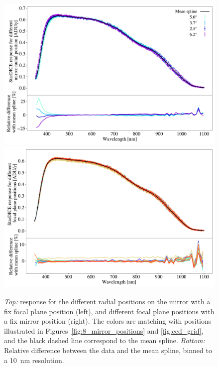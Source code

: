 \begin{figure}[ht]
    \centering
    \includegraphics[width=\columnwidth]{fig/radial_positions.pdf}
    \includegraphics[width=\columnwidth]{fig/ccd_positions.pdf}
    \caption{\textit{Top:} \SD response for the different radial positions on the mirror with a fix focal plane position (left), and different focal plane positions  with a fix mirror position (right). The colors are matching with positions illustrated in Figures~\ref{fig:8_mirror_positions} and \ref{fig:ccd_grid}, and the black dashed line correspond to the mean spline. \textit{Bottom:} Relative difference between the data and the mean spline, binned to a \SI{10}{\nano\meter} resolution.}
    \label{fig:radial_positions}
\end{figure}

